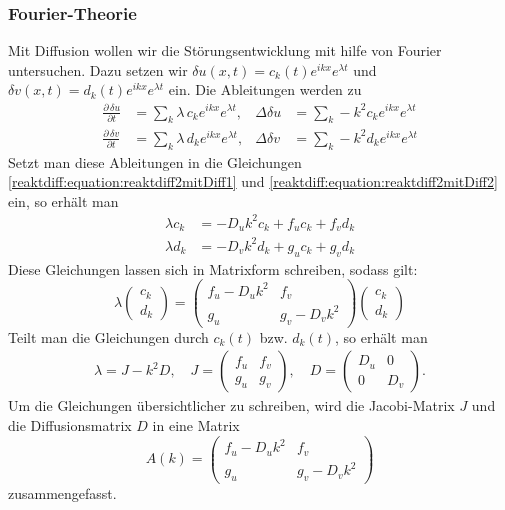 \subsubsection{Fourier-Theorie}
Mit Diffusion wollen wir die Störungsentwicklung mit hilfe von Fourier untersuchen.
Dazu setzen wir \(\delta u(x,t) = c_k(t) e^{ikx} e^{\lambda t}\) und \(\delta v(x,t) = d_k(t) e^{ikx} e^{\lambda t}\) ein.
Die Ableitungen werden zu
\begin{align*}
    \frac{\partial\,\delta u}{\partial t} &= \sum_k \lambda\, c_k e^{i k x} e^{\lambda t}, &
    \Delta \delta u &= \sum_k -k^2 c_k e^{i k x} e^{\lambda t} \\
    \frac{\partial\,\delta v}{\partial t} &= \sum_k \lambda\, d_k e^{i k x} e^{\lambda t}, &
    \Delta \delta v &= \sum_k -k^2 d_k e^{i k x} e^{\lambda t}
\end{align*}
Setzt man diese Ableitungen in die Gleichungen \eqref{reaktdiff:equation:reaktdiff2mitDiff1} und \eqref{reaktdiff:equation:reaktdiff2mitDiff2} ein, so erhält man
    \begin{align*}
        \lambda c_k &= -D_u k^2 c_k + f_u c_k + f_v d_k \\
        \lambda d_k &= -D_v k^2 d_k + g_u c_k + g_v d_k
    \end{align*}
Diese Gleichungen lassen sich in Matrixform schreiben, sodass gilt:
\begin{equation*}
    \lambda
    \begin{pmatrix}
    c_k \\
    d_k
    \end{pmatrix}
    =
    \begin{pmatrix}
        f_u - D_u k^2 & f_v \\
        g_u & g_v - D_v k^2
    \end{pmatrix}
    \begin{pmatrix}
    c_k \\
    d_k
    \end{pmatrix}
\end{equation*}
Teilt man die Gleichungen durch \(c_k(t)\) bzw. \(d_k(t)\), so erhält man
\begin{align}
    \label{reaktdiff:equation:reaktdiff2mitDiffFourierk}
    \lambda = J - k^2 D, \quad 
    J =
    \begin{pmatrix}
        f_u & f_v\\
        g_u & g_v
    \end{pmatrix}, \quad
    D =
    \begin{pmatrix}
        D_u & 0\\
        0 & D_v
    \end{pmatrix}.
\end{align}
Um die Gleichungen übersichtlicher zu schreiben, wird die Jacobi-Matrix \(J\) und die Diffusionsmatrix \(D\) in eine Matrix
\begin{equation}
    \label{reaktdiff:equation:reaktdiff2mitDiffFourierkA}
    A(k) =
    \begin{pmatrix}
        f_u - D_u k^2 & f_v\\
        g_u & g_v - D_v k^2
    \end{pmatrix}
\end{equation}
zusammengefasst.

